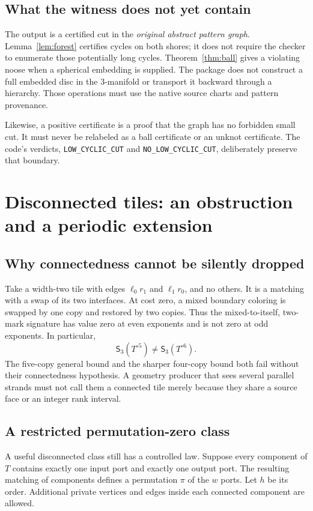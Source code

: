 \documentclass[11pt]{article}
\theoremstyle{remark}\newtheorem{remark}[theorem]{Remark}
\newcommand{\Sig}{\mathsf S}
\DeclareRobustCommand{\code}[1]{\nolinkurl{#1}}
\begin{document}
\subsection{What the witness does not yet contain}
The output is a certified cut in the \emph{original abstract pattern graph}. Lemma~\ref{lem:forest} certifies cycles on both shores; it does not require the checker to enumerate those potentially long cycles. Theorem~\ref{thm:ball} gives a violating noose when a spherical embedding is supplied. The package does not construct a full embedded disc in the 3-manifold or transport it backward through a hierarchy. Those operations must use the native source charts and pattern provenance.

Likewise, a positive certificate is a proof that the graph has no forbidden small cut. It must never be relabeled as a ball certificate or an unknot certificate. The code's verdicts, \code{LOW_CYCLIC_CUT} and \code{NO_LOW_CYCLIC_CUT}, deliberately preserve that boundary.

\section{Disconnected tiles: an obstruction and a periodic extension}
\subsection{Why connectedness cannot be silently dropped}
Take a width-two tile with edges $\ell_0r_1$ and $\ell_1r_0$, and no others. It is a matching with a swap of its two interfaces. At cost zero, a mixed boundary coloring is swapped by one copy and restored by two copies. Thus the mixed-to-itself, two-mark signature has value zero at even exponents and is not zero at odd exponents. In particular,
\[
 \Sig_3(T^{\circ5})\ne\Sig_3(T^{\circ6}).
\]
The five-copy general bound and the sharper four-copy bound both fail without their connectedness hypothesis. A geometry producer that sees several parallel strands must not call them a connected tile merely because they share a source face or an integer rank interval.

\subsection{A restricted permutation-zero class}
A useful disconnected class still has a controlled law. Suppose every component of $T$ contains exactly one input port and exactly one output port. The resulting matching of components defines a permutation $\pi$ of the $w$ ports. Let $h$ be its order. Additional private vertices and edges inside each connected component are allowed.
\end{document}
